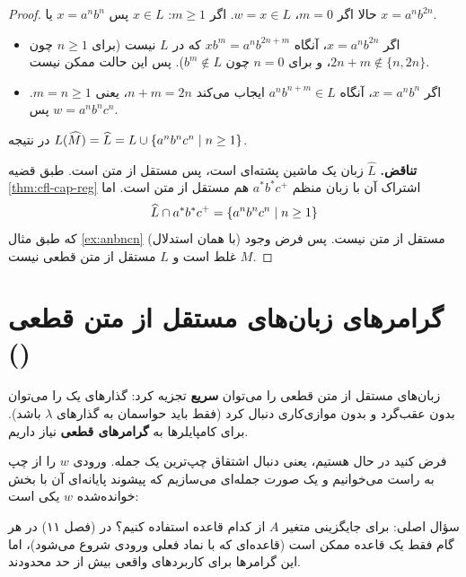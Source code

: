 \begin{proof}
حالا اگر $m=0$، $w=x\in L$. اگر $m\ge1$: $x\in L$ پس $x=a^nb^n$ یا $x=a^nb^{2n}$.
\begin{itemize}
\item اگر $x=a^nb^{2n}$، آنگاه $xb^m=a^nb^{2n+m}$ که در $L$ نیست (برای $n\ge1$ چون $2n+m\notin\{n,2n\}$، و برای $n=0$ چون $b^m\notin L$). پس این حالت ممکن نیست.
\item اگر $x=a^nb^n$، آنگاه $a^nb^{n+m}\in L$ ایجاب می‌کند $n+m=2n$، یعنی $m=n\ge1$. پس $w=a^nb^nc^n$.
\end{itemize}
در نتیجه $L(\widehat M)=\widehat L=L\cup\{a^nb^nc^n\mid n\ge1\}$.

\textbf{تناقض.} $\widehat L$ زبان یک ماشین پشته‌ای است، پس مستقل از متن است. طبق قضیه \ref{thm:cfl-cap-reg} اشتراک آن با زبان منظم $a^*b^*c^+$ هم مستقل از متن است. اما
\[\widehat L\cap a^*b^*c^+=\{a^nb^nc^n\mid n\ge1\}\]
که طبق مثال \ref{ex:anbncn} (با همان استدلال) مستقل از متن نیست. پس فرض وجود $M$ غلط است و $L$ مستقل از متن قطعی نیست.
\end{proof}

\section{گرامرهای زبان‌های مستقل از متن قطعی ()}

زبان‌های مستقل از متن قطعی را می‌توان \textbf{سریع} تجزیه کرد: گذارهای یک  را می‌توان بدون عقب‌گرد و بدون موازی‌کاری دنبال کرد (فقط باید حواسمان به گذارهای $\lambda$ باشد). برای کامپایلرها به \textbf{گرامرهای قطعی} نیاز داریم.

فرض کنید در حال  هستیم، یعنی دنبال اشتقاق چپ‌ترین یک جمله. ورودی $w$ را از چپ به راست می‌خوانیم و یک صورت جمله‌ای می‌سازیم که پیشوند پایانه‌ای آن با بخش خوانده‌شده $w$ یکی است:
\begin{ltrfig}
\end{ltrfig}
سؤال اصلی: برای جایگزینی متغیر $A$ از کدام قاعده استفاده کنیم؟ در  (فصل ۱۱) در هر گام فقط یک قاعده ممکن است (قاعده‌ای که با نماد فعلی ورودی شروع می‌شود)، اما این گرامرها برای کاربردهای واقعی بیش از حد محدودند.

